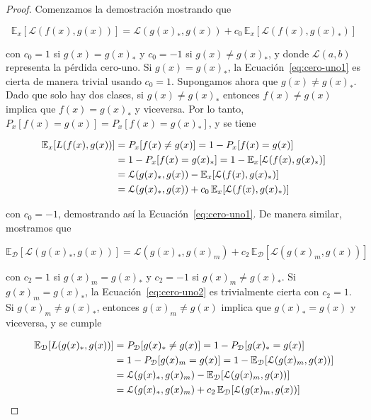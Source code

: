 \begin{proof}
    Comenzamos la demostración mostrando que

    \begin{equation}\label{eq:cero-uno1}
        \mathbb{E}_{x}[\mathcal{L}(f(x), g(x))] = \mathcal{L}(g(x)_*, g(x)) + c_0 \, \mathbb{E}_{x}[\mathcal{L}(f(x), g(x)_*)]
    \end{equation}

    con $c_0 = 1$ si $g(x) = g(x)_*$ y $c_0 = -1$ si $g(x) \neq g(x)_*$, y donde $\mathcal{L}(a, b)$ representa la pérdida cero-uno. Si $g(x) = g(x)_*$, la Ecuación~\eqref{eq:cero-uno1} es cierta de manera trivial usando $c_0 = 1$. Supongamos ahora que $g(x) \neq g(x)_*$. Dado que solo hay dos clases, si $g(x) \neq g(x)_*$ entonces $f(x) \neq g(x)$ implica que $f(x) = g(x)_*$ y viceversa. Por lo tanto, $P_{x}[f(x) = g(x)] = P_{x}[f(x) = g(x)_*]$, y se tiene

    \begin{align}
        \mathbb{E}_x[L(f(x), g(x))] 
        &= P_{x}[f(x) \neq g(x)] \notag = 1 - P_{x}[f(x) = g(x)] \notag \\
        &= 1 - P_{x}[f(x) = g(x)_*] \notag = 1 - \mathbb{E}_{x}[\mathcal{L}(f(x), g(x)_*)] \notag \\
        &= \mathcal{L}(g(x)_*, g(x)) - \mathbb{E}_{x}[\mathcal{L}(f(x), g(x)_*)] \notag \\
        &= \mathcal{L}(g(x)_*, g(x)) + c_0 \, \mathbb{E}_{x}[\mathcal{L}(f(x), g(x)_*)]
    \end{align}        

    con $c_0 = -1$, demostrando así la Ecuación~\eqref{eq:cero-uno1}. De manera similar, mostramos que

    \begin{equation}\label{eq:cero-uno2}
        \mathbb{E}_\mathcal{D}[\mathcal{L}(g(x)_*, g(x))] = \mathcal{L}(g(x)_*, g(x)_m) + c_2 \, \mathbb{E}_\mathcal{D}[\mathcal{L}(g(x)_m, g(x))]
    \end{equation}

    con $c_2 = 1$ si $g(x)_m = g(x)_*$ y $c_2 = -1$ si $g(x)_m \neq g(x)_*$. Si $g(x)_m = g(x)_*$, la Ecuación~\eqref{eq:cero-uno2} es trivialmente cierta con $c_2 = 1$. Si $g(x)_m \neq g(x)_*$, entonces $g(x)_m \neq g(x)$ implica que $g(x)_* = g(x)$ y viceversa, y se cumple

    \begin{align}
        \mathbb{E}_\mathcal{D}[L(g(x)_*, g(x))]
        &= P_\mathcal{D}[g(x)_* \neq g(x)] = 1 - P_\mathcal{D}[g(x)_* = g(x)] \notag \\
        &= 1 - P_\mathcal{D}[g(x)_m = g(x)] = 1 - \mathbb{E}_\mathcal{D}[\mathcal{L}(g(x)_m, g(x))] \notag \\
        &= \mathcal{L}(g(x)_*, g(x)_m) - \mathbb{E}_\mathcal{D}[\mathcal{L}(g(x)_m, g(x))] \notag \\
        &= \mathcal{L}(g(x)_*, g(x)_m) + c_2 \, \mathbb{E}_\mathcal{D}[\mathcal{L}(g(x)_m, g(x))]
    \end{align}  


\end{proof}
